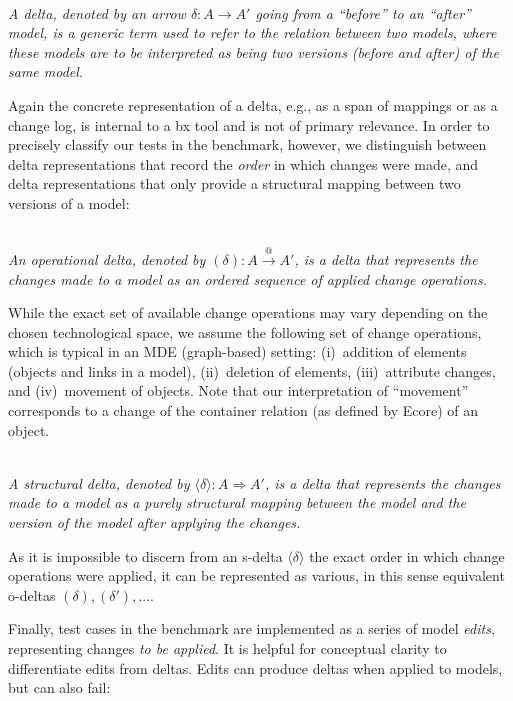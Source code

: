\begin{definition}[Delta]
\label{def: delta}~\\
\emph{A delta, denoted by an arrow $\delta: A \rightarrow A'$ going from a ``before'' to an ``after'' model, is a generic term used to refer to the relation between two models, where these models are to be interpreted as being two versions (before and after) of the same model.}
\end{definition}
%
Again the concrete representation of a delta, e.g., as a span of mappings or as a change log, is internal to a bx tool and is not of primary relevance.
In order to precisely classify our tests in the benchmark, however, we distinguish between delta representations that record the \emph{order} in which changes were made, and delta representations that only provide a structural mapping between two versions of a model:  

\begin{definition}
\label{def: o-delta}~\\
\emph{An operational delta, denoted by $(\delta): A \stackrel{@}{\rightarrow} A'$, is a delta that represents the changes made to a model as an ordered sequence of applied change operations.}
\end{definition}
%
While the exact set of available change operations may vary depending on the chosen technological space, we assume the following set of change operations, which is typical in an MDE (graph-based) setting:  (i)~addition of elements (objects and links in a model), (ii)~deletion of elements, (iii)~attribute changes, and (iv)~movement of objects.
Note that our interpretation of ``movement'' corresponds to a change of the container relation (as defined by Ecore) of an object.

\begin{definition}
\label{def: s-delta}~\\
\emph{A structural delta, denoted by $\langle\delta\rangle: A \Rightarrow A'$, is a delta that represents the changes made to a model as a purely structural mapping between the model and the version of the model after applying the changes.}
\end{definition}
%
As it is impossible to discern from an s-delta $\langle\delta\rangle$ the exact order in which change operations were applied, it can be represented as various, in this sense equivalent o-deltas $(\delta), (\delta'), ...$.

Finally, test cases in the benchmark are implemented as a series of model \emph{edits}, representing changes \emph{to be applied}.
It is helpful for conceptual clarity to differentiate edits from deltas.
Edits can produce deltas when applied to models, but can also fail:

